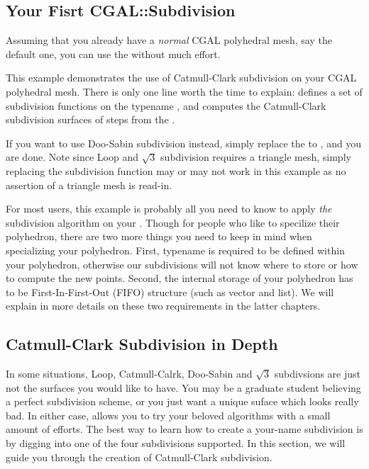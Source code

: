 \subsection{Your Fisrt CGAL::Subdivision}
Assuming that you already have a \emph{normal} CGAL polyhedral mesh,
say the default one, you can use the 
without much effort.


This example demonstrates the use of Catmull-Clark subdivision
on your CGAL polyhedral mesh. There is only one line worth the time to explain:
 defines a set of subdivision functions
on the typename , and  
computes the Catmull-Clark subdivision surfaces of  steps from the 
.

If you want to use Doo-Sabin subdivision instead, simply replace the 
 to , 
and you are done. Note since Loop and $\sqrt{3}$ subdivision requires 
a triangle mesh, simply replacing the subdivision function may or 
may not work in this example as no assertion of a triangle mesh is 
read-in.

For most users, this example is probably all you need to know to
apply \emph{the} subdivision algorithm on your .
Though for people who like to specilize their polyhedron,
there are two more things you need to keep in mind when specializing 
your polyhedron. First, typename  is 
required to be defined within your polyhedron, otherwise our
subdivisions will not know where to store or how to compute the
new points. Second, the internal storage of your polyhedron has to be
First-In-First-Out (FIFO) structure (such as vector and list). We will 
explain in more details on these two requirements in the latter chapters.

\subsection{Catmull-Clark Subdivision in Depth}
In some situations, Loop, Catmull-Calrk, Doo-Sabin and $\sqrt{3}$ 
subdivsions are just not the surfaces you would like to have. You 
may be a graduate student believing a perfect subdivision scheme, or
you just want a unique suface which looks really bad. In either case,
 allows you to try your beloved algorithms
with a small amount of efforts. The best way to learn how to create
a your-name subdivision is by digging into one of the four subdivisions
 supported. In this section, we will guide 
you through the creation of Catmull-Clark subdivision.

